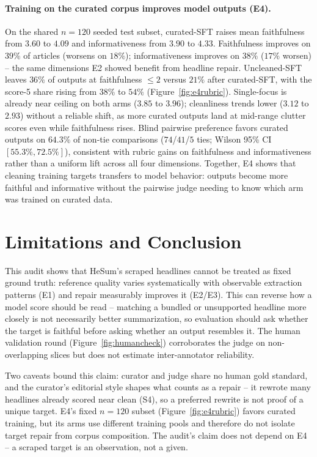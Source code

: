 \documentclass[11pt]{article}
\begin{document}
\paragraph{Training on the curated corpus improves model outputs (E4).}
\label{sec:e4-results}
On the shared $n=120$ seeded test subset, curated-SFT raises mean faithfulness from $3.60$ to
$4.09$ and informativeness from $3.90$ to $4.33$. Faithfulness improves on $39\%$ of articles
(worsens on $18\%$); informativeness improves on $38\%$ ($17\%$ worsen) -- the same dimensions
E2 showed benefit from headline repair. Uncleaned-SFT leaves $36\%$ of outputs at faithfulness
$\le 2$ versus $21\%$ after curated-SFT, with the score-5 share rising from $38\%$ to $54\%$
(Figure~\ref{fig:e4rubric}). Single-focus is already near ceiling on both arms ($3.85$ to $3.96$);
cleanliness trends lower ($3.12$ to $2.93$) without a reliable shift, as more curated outputs land
at mid-range clutter scores even while faithfulness rises. Blind pairwise preference favors curated
outputs on $64.3\%$ of non-tie comparisons ($74$/$41$/$5$ ties; Wilson 95\% CI $[55.3\%,72.5\%]$),
consistent with rubric gains on faithfulness and informativeness rather than a uniform lift across
all four dimensions. Together, E4 shows that cleaning training targets transfers to model behavior:
outputs become more faithful and informative without the pairwise judge needing to know which arm
was trained on curated data.

\section{Limitations and Conclusion}
\label{sec:limitations}
This audit shows that HeSum's scraped headlines cannot be treated as fixed ground truth: reference
quality varies systematically with observable extraction patterns (E1) and repair measurably improves it
(E2/E3). This can reverse how a model score should be read -- matching a bundled or unsupported
headline more closely is not necessarily better summarization, so evaluation should ask whether the
target is faithful before asking whether an output resembles it. The human validation round
(Figure~\ref{fig:humancheck}) corroborates the judge on non-overlapping slices but does not estimate
inter-annotator reliability.

Two caveats bound this claim: curator and judge share no human gold standard, and the curator's
editorial style shapes what counts as a repair -- it rewrote many headlines already scored near
clean (S4), so a preferred rewrite is not proof of a unique target. E4's fixed $n=120$ subset
(Figure~\ref{fig:e4rubric}) favors curated training, but its arms use different training pools and
therefore do not isolate target repair from corpus composition. The audit's claim does not depend on
E4 -- a scraped target is an observation, not a given.
\end{document}
